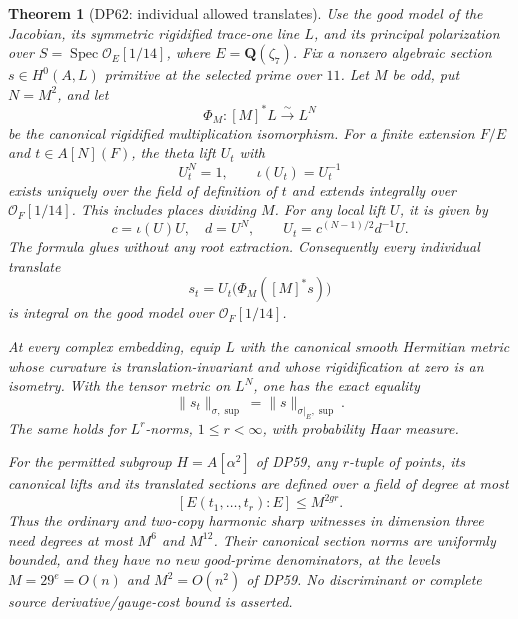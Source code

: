 \documentclass[11pt,a4paper]{article}
\newtheorem{theorem}{Theorem}[section]
\theoremstyle{definition}\newtheorem{remark}[theorem]{Remark}
\begin{document}
\begin{theorem}[DP62: individual allowed translates]\label{DP62}
Use the good model of the Jacobian, its symmetric rigidified trace-one line $L$, and its principal polarization over
$S=\operatorname{Spec}\mathcal O_E[1/14]$, where $E=\mathbf Q(\zeta_7)$.
Fix a nonzero algebraic section $s\in H^0(A,L)$ primitive at the selected prime over $11$.
Let $M$ be odd, put $N=M^2$, and let
\[
 \Phi_M:[M]^*L\xrightarrow{\sim}L^N
\]
be the canonical rigidified multiplication isomorphism.
For a finite extension $F/E$ and $t\in A[N](F)$, the theta lift $U_t$ with
\[
 U_t^N=1,\qquad \iota(U_t)=U_t^{-1}
\]
exists uniquely over the field of definition of $t$ and extends integrally over $\mathcal O_F[1/14]$.
This includes places dividing $M$.
For any local lift $U$, it is given by
\begin{equation}\label{eq:rootfreethetalift}
 c=\iota(U)U,\quad d=U^N,\qquad
 U_t=c^{(N-1)/2}d^{-1}U.
\end{equation}
The formula glues without any root extraction.
Consequently every individual translate
\[
 s_t=U_t\bigl(\Phi_M([M]^*s)\bigr)
\]
is integral on the good model over $\mathcal O_F[1/14]$.

At every complex embedding, equip $L$ with the canonical smooth Hermitian metric whose curvature is translation-invariant and whose rigidification at zero is an isometry.
With the tensor metric on $L^N$, one has the exact equality
\begin{equation}\label{eq:individualthetanorm}
 \|s_t\|_{\sigma,\sup}
 =\|s\|_{\sigma|_E,\sup}.
\end{equation}
The same holds for $L^r$-norms, $1\le r<\infty$, with probability Haar measure.

For the permitted subgroup $H=A[\alpha^2]$ of DP59, any $r$-tuple of points, its canonical lifts and its translated sections are defined over a field of degree at most
\[
 [E(t_1,\ldots,t_r):E]\le M^{2gr}.
\]
Thus the ordinary and two-copy harmonic sharp witnesses in dimension three need degrees at most $M^6$ and $M^{12}$.
Their canonical section norms are uniformly bounded, and they have no new good-prime denominators, at the levels $M=29^e=O(n)$ and $M^2=O(n^2)$ of DP59.
No discriminant or complete source derivative/gauge-cost bound is asserted.
\end{theorem}
\end{document}
